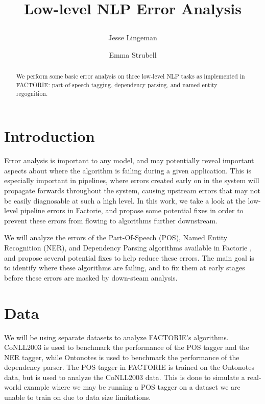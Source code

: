 \documentclass[12pt]{article}
\title{
\LARGE\bf Low-level NLP Error Analysis \\
\date{}
\author{ Jesse Lingeman \and Emma Strubell}
}
\begin{document}
\maketitle

\begin{abstract}
We perform some basic error analysis on three low-level NLP tasks as implemented in FACTORIE: part-of-speech tagging, dependency parsing, and named entity regognition.
\end{abstract}

\thispagestyle{fancy}


\section{Introduction}
Error analysis is important to any model, and may potentially reveal important aspects about where the algorithm is failing during a given application. This is especially important in pipelines, where errors created early on in the system will propagate forwards throughout the system, causing upstream errors that may not be easily diagnosable at such a high level. In this work, we take a look at the low-level pipeline errors in Factorie, and propose some potential fixes in order to prevent these errors from flowing to algorithms further downstream.

We will analyze the errors of the Part-Of-Speech (POS), Named Entity Recognition (NER), and Dependency Parsing algorithms available in Factorie \citep{mccallum09:factorie:}, and propose several potential fixes to help reduce these errors. The main goal is to identify where these algorithms are failing, and to fix them at early stages before these errors are masked by down-steam analysis.

\section{Data}
We will be using separate datasets to analyze FACTORIE's algorithms. CoNLL2003 \cite{Sang:2003gh} is used to benchmark the performance of the POS tagger and the NER tagger, while Ontonotes \cite{Hovy:2006wi} is used to benchmark the performance of the dependency parser. The POS tagger in FACTORIE is trained on the Ontonotes data, but is used to analyze the CoNLL2003 data. This is done to simulate a real-world example where we may be running a POS tagger on a dataset we are unable to train on due to data size limitations.
\end{document}
